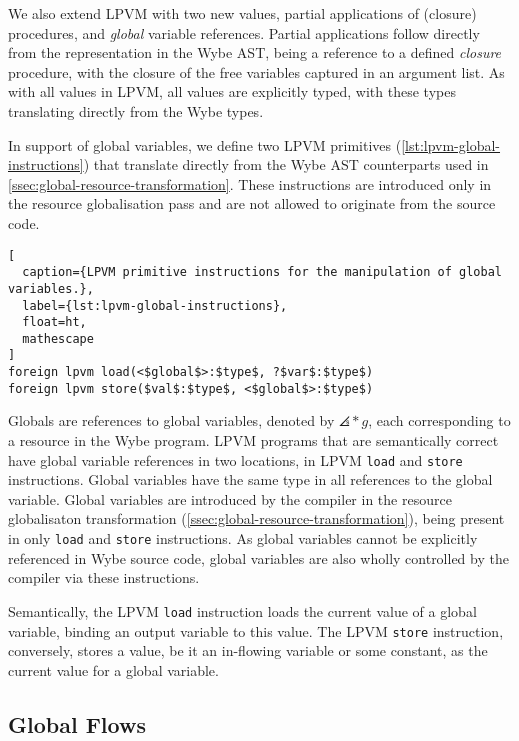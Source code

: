 We also extend LPVM with two new values, partial applications of (closure) procedures, and \textit{global} variable references. Partial applications follow directly from the representation in the Wybe AST, being a reference to a defined \textit{closure} procedure, with the closure of the free variables captured in an argument list. As with all values in LPVM, all values are explicitly typed, with these types translating directly from the Wybe types.

In support of global variables, we define two LPVM primitives (\cref{lst:lpvm-global-instructions}) that translate directly from the Wybe AST counterparts used in \cref{ssec:global-resource-transformation}. These instructions are introduced only in the resource globalisation pass and are not allowed to originate from the source code.

\begin{lstlisting}[
  caption={LPVM primitive instructions for the manipulation of global variables.},
  label={lst:lpvm-global-instructions},
  float=ht,
  mathescape
]
foreign lpvm load(<$global$>:$type$, ?$var$:$type$)
foreign lpvm store($val$:$type$, <$global$>:$type$)
\end{lstlisting}

Globals are references to global variables, denoted by $\angles*{g}$, each corresponding to a resource in the Wybe program. LPVM programs that are semantically correct have global variable references in two locations, in LPVM \texttt{load} and \texttt{store} instructions. Global variables have the same type in all references to the global variable. Global variables are introduced by the compiler in the resource globalisaton transformation (\cref{ssec:global-resource-transformation}), being present in only \texttt{load} and \texttt{store} instructions. As global variables cannot be explicitly referenced in Wybe source code, global variables are also wholly controlled by the compiler via these instructions. 

Semantically, the LPVM \texttt{load} instruction loads the current value of a global variable, binding an output variable to this value. The LPVM \texttt{store} instruction, conversely, stores a value, be it an in-flowing variable or some constant, as the current value for a global variable. 

\subsection{Global Flows}
\label{ssec:global-flows}

